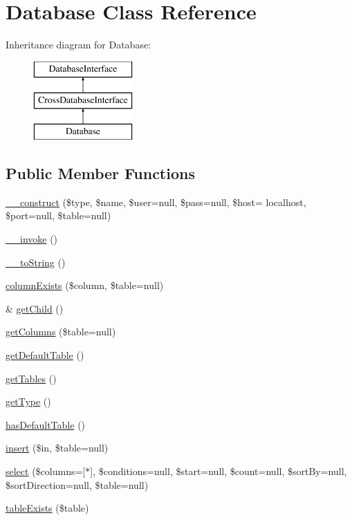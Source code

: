 \hypertarget{class_database}{}\section{Database Class Reference}
\label{class_database}
Inheritance diagram for Database\+:\begin{figure}[H]
\begin{center}
\leavevmode
\includegraphics[height=3.000000cm]{class_database}
\end{center}
\end{figure}
\subsection*{Public Member Functions}
\begin{DoxyCompactItemize}
\item 
\hyperlink{class_database_a8621f88c8cc4a5d71e2856647c086438}{\+\_\+\+\_\+construct} (\$type, \$name, \$user=null, \$pass=null, \$host= \textquotesingle{}localhost\textquotesingle{}, \$port=null, \$table=null)
\item 
\hyperlink{class_database_a9aac7e1475efe923de4e19cc2511f092}{\+\_\+\+\_\+invoke} ()
\item 
\hyperlink{class_database_a7516ca30af0db3cdbf9a7739b48ce91d}{\+\_\+\+\_\+to\+String} ()
\item 
\hyperlink{class_database_a42c4cefdb183a7caa3115193a811d893}{column\+Exists} (\$column, \$table=null)
\item 
\& \hyperlink{class_database_a4196f3b1da0c3bbc3ec6f862e2c4e197}{get\+Child} ()
\item 
\hyperlink{class_database_a5cc0962e790b9ccffd2ca9c77cead320}{get\+Columns} (\$table=null)
\item 
\hyperlink{class_database_af54c3eed64c3e3dfb06a2541289ff0da}{get\+Default\+Table} ()
\item 
\hyperlink{class_database_a61b9097ace78236a1a7f9cfd9e9ab01c}{get\+Tables} ()
\item 
\hyperlink{class_database_a830b5c75df72b32396701bc563fbe3c7}{get\+Type} ()
\item 
\hyperlink{class_database_ad0aa1804fc79c22b46596db136320017}{has\+Default\+Table} ()
\item 
\hyperlink{class_database_a8e5626f114925dee9986c8edbfc3ec05}{insert} (\$in, \$table=null)
\item 
\hyperlink{class_database_a1efc6b974510d4c668660f1abe184182}{select} (\$columns=\mbox{[}\textquotesingle{}$\ast$\textquotesingle{}\mbox{]}, \$conditions=null, \$start=null, \$count=null, \$sort\+By=null, \$sort\+Direction=null, \$table=null)
\item 
\hyperlink{class_database_ae7cdaa744d52a1eb0103e377023ca528}{table\+Exists} (\$table)
\end{DoxyCompactItemize}
